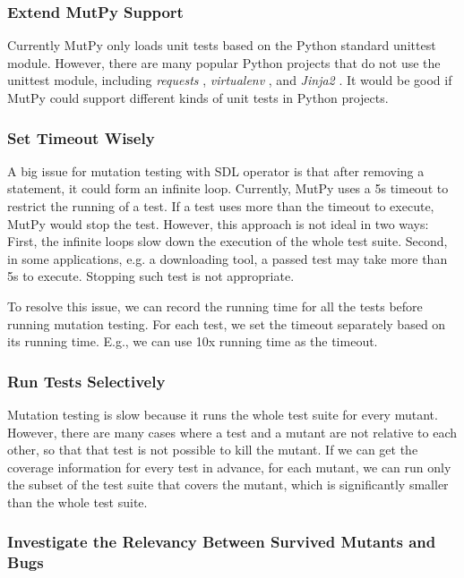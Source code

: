 \documentclass[12pt]{article}
\begin{document}
\subsubsection{Extend MutPy Support}

Currently MutPy only loads unit tests based on the Python standard unittest module. However, there are many popular Python projects that do not use the unittest module, including \emph{requests} \cite{requests}, \emph{virtualenv} \cite{virtualenv}, and \emph{Jinja2} \cite{jinja2}. It would be good if MutPy could support different kinds of unit tests in Python projects.

\subsubsection{Set Timeout Wisely}

A big issue for mutation testing with SDL operator is that after removing a statement, it could form an infinite loop. Currently, MutPy uses a 5s timeout to restrict the running of a test. If a test uses more than the timeout to execute, MutPy would stop the test. However, this approach is not ideal in two ways: First, the infinite loops slow down the execution of the whole test suite. Second, in some applications, e.g. a downloading tool, a passed test may take more than 5s to execute. Stopping such test is not appropriate.

To resolve this issue, we can record the running time for all the tests before running mutation testing. For each test, we set the timeout separately based on its running time. E.g., we can use 10x running time as the timeout.

\subsubsection{Run Tests Selectively}

Mutation testing is slow because it runs the whole test suite for every mutant. However, there are many cases where a test and a mutant are not relative to each other, so that that test is not possible to kill the mutant. If we can get the coverage information for every test in advance, for each mutant, we can run only the subset of the test suite that covers the mutant, which is significantly smaller than the whole test suite.

\subsubsection{Investigate the Relevancy Between Survived Mutants and Bugs}
\end{document}
